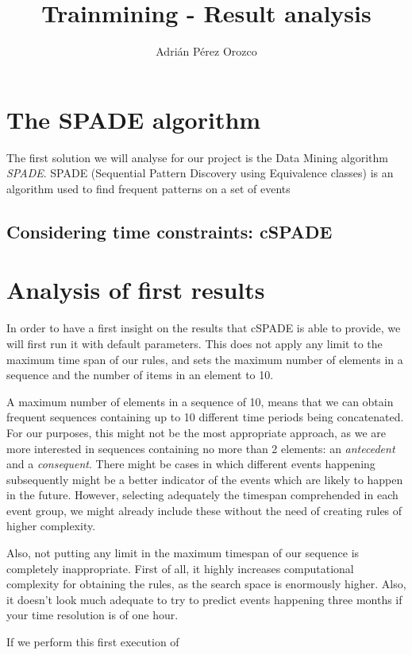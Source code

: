 \documentclass[a4paper,10pt]{article}
\title{Trainmining - Result analysis}
\author{Adrián Pérez Orozco}
\begin{document}
\maketitle

\section{The SPADE algorithm}
The first solution we will analyse for our project is the Data Mining algorithm \emph{SPADE}. SPADE (Sequential Pattern Discovery using Equivalence classes) is an algorithm used to find frequent patterns on a set of events 

\subsection{Considering time constraints: cSPADE}

\section{Analysis of first results}
In order to have a first insight on the results that cSPADE is able to provide, we will first run it with default parameters. This does not apply any limit to the maximum time span of our rules, and sets the maximum number of elements in a sequence and the number of items in an element to 10.

A maximum number of elements in a sequence of 10, means that we can obtain frequent sequences containing up to 10 different time periods being concatenated. For our purposes, this might not be the most appropriate approach, as we are more interested in sequences containing no more than 2 elements: an \emph{antecedent} and a \emph{consequent}. There might be cases in which different events happening subsequently might be a better indicator of the events which are likely to happen in the future. However, selecting adequately the timespan comprehended in each event group, we might already include these without the need of creating rules of higher complexity.

Also, not putting any limit in the maximum timespan of our sequence is completely inappropriate. First of all, it highly increases computational complexity for obtaining the rules, as the search space is enormously higher. Also, it doesn't look much adequate to try to predict events happening three months if your time resolution is of one hour. 

If we perform this first execution of 



 
\end{document}
